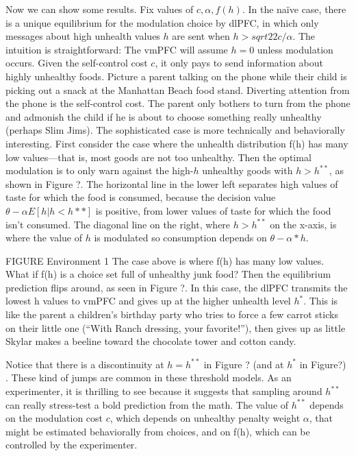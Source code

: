 \documentclass{article}
\begin{document}
	Now we can show some results. Fix values of $c, \alpha, f(h)$. In the naïve case, there is  a unique equilibrium for the modulation choice by dlPFC, in which only messages about high unhealth values $h$ are sent when $h>sqrt{2}{2c}/\alpha$. The intuition is straightforward: The vmPFC will assume $h=0$ unless modulation occurs. Given the self-control cost $c$, it only pays to send information about highly unhealthy foods.  Picture a parent talking on the phone while their child is picking out a snack at the Manhattan Beach food stand. Diverting attention from the phone is the self-control cost. The parent only bothers to turn from the phone and admonish the child if he is about to choose something really unhealthy (perhaps Slim Jims).
The sophisticated case is more technically and behaviorally interesting. 
First consider the case where the unhealth distribution f(h) has many low values—that is, most goods are not too unhealthy. Then the optimal modulation is to only warn against the high-$h$ unhealthy goods with $h>h^{**}$, as shown in Figure ?. The horizontal line in the lower left separates high values of taste for which the food is consumed, because the decision value $\theta - \alpha E[h|h<h**]$ is positive, from lower values of taste for which the food isn’t consumed. The diagonal line on the right, where $h>h^{**}$ on the x-axis, is where the value of $h$ is modulated so consumption depends on $\theta-\alpha*h$. 

FIGURE Environment 1
The case above is where f(h) has many low values. What if f(h) is a choice set full of unhealthy junk food? Then the equilibrium prediction flips around, as seen in Figure ?. In this case, the dlPFC transmits the lowest h values to vmPFC and gives up at the higher unhealth level $h^*$. This is like the parent a children’s birthday party who tries to force a few carrot sticks on their little one (“With Ranch dressing, your favorite!”), then gives up as little Skylar makes a beeline toward the chocolate tower and cotton candy. 

Notice that there is a discontinuity at $h=h^{**}$ in Figure ? (and at $h^*$ in Figure?) . These kind of jumps are common in these threshold models. As an experimenter, it is thrilling to see because it suggests that sampling around $h^{**}$ can really stress-test a bold prediction from the math. The value of $h^{**}$ depends on the modulation cost $c$, which depends on unhealthy penalty weight $\alpha$, that might be estimated behaviorally from choices, and on f(h), which can be controlled by the experimenter.  
\end{document}
